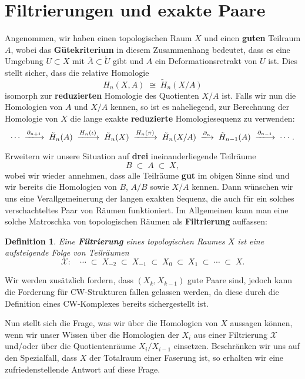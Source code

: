 \documentclass[12pt]{article}
\numberwithin{conj}{section}
\newtheorem{definition}[conj]{Definition}
\begin{document}
    \section{Filtrierungen und exakte Paare}
    Angenommen, wir haben einen topologischen Raum $X$ und einen \textbf{guten} Teilraum
    $A$, wobei das \textbf{Gütekriterium} in diesem Zusammenhang bedeutet, dass es
    eine Umgebung $U \subset X$ mit $\overline{A}\subset \mathring{U}$ gibt und
    $A$ ein Deformationsretrakt von $U$ ist. Dies stellt sicher, dass die relative
    Homologie
    \[
        H_{n}(X,A) \;\cong\; \tilde{H}_{n}(X/A) 
    \]
    isomorph zur \textbf{reduzierten} Homologie des Quotienten $X/A$ ist. Falls
    wir nun die Homologien von $A$ und $X/A$ kennen, so ist es naheliegend, zur
    Berechnung der Homologie von $X$ die lange exakte \textbf{reduzierte} Homologiesequenz
    zu verwenden:
    \[
        \cdots \;\xlongrightarrow{\partial_{n+1}}\; \tilde{H}_{n}(A) \;\xlongrightarrow{H_n(\iota)}\; \tilde{H}_{n}
        (X) \;\xlongrightarrow{H_n(\pi)}\; \tilde{H}_{n}(X/A)  \;\xlongrightarrow{\partial_n}\; \tilde
        {H}_{n-1}(A) \;\xlongrightarrow{\partial_{n-1}}\; \cdots
        .
    \]

    Erweitern wir unsere Situation auf \textbf{drei} ineinanderliegende Teilräume
    \[
        B \;\subset\; A \;\subset\; X,
    \]
    wobei wir wieder annehmen, dass alle Teilräume \textbf{gut} im obigen Sinne
    sind und wir bereits die Homologien von $B$, $A/B$ sowie $X/A$ kennen. Dann
    wünschen wir uns eine Verallgemeinerung der langen exakten Sequenz, die auch für
    ein solches verschachteltes Paar von Räumen funktioniert. Im Allgemeinen kann
    man eine solche Matroschka von topologischen Räumen als \textbf{Filtrierung}
    auffassen:

    \begin{definition}
        Eine \textbf{Filtrierung} eines topologischen Raumes $X$ ist eine
        aufsteigende Folge von Teilräumen
        \[
            \mathcal{X}:\quad \cdots \;\subset\; X_{-2}\;\subset\; X_{-1}\;\subset\; X_{0}
            \;\subset\; X_{1}\;\subset\; \cdots \;\subset\; X.
        \]
    \end{definition}

    Wir werden zusätzlich fordern, dass $(X_k,X_{k-1})$ gute Paare sind, jedoch kann die Forderung für CW-Strukturen fallen gelassen werden, da diese durch die Definition eines CW-Komplexes bereits sichergestellt ist.

    Nun stellt sich die Frage, was wir über die Homologien von $X$ aussagen können,
    wenn wir unser Wissen über die Homologien der $X_{i}$ aus einer Filtrierung $\mathcal{X}$
    und/oder über die Quotientenräume $X_{i}/X_{i-1}$ einsetzen. Beschränken wir
    uns auf den Spezialfall, dass $X$ der Totalraum einer Faserung ist, so
    erhalten wir eine zufriedenstellende Antwort auf diese Frage.
\end{document}
